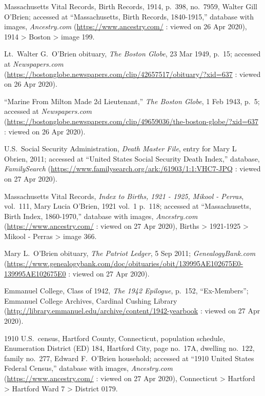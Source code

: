 \begin{thebibliography}{999}
	Massachusetts Vital Records, Birth Records, 1914, p.\ 398, no.\ 7959, Walter Gill O'Brien; accessed at ``Massachusetts, Birth Records, 1840-1915,'' database with images, \textit{Ancestry.com} (\url{https://www.ancestry.com/} : viewed on 26 Apr 2020), 1914 > Boston > image 199.
	
	Lt.\ Walter G.\ O'Brien obituary, \textit{The Boston Globe}, 23 Mar 1949, p.\ 15; accessed at \textit{Newspapers.com} (\url{https://bostonglobe.newspapers.com/clip/42657517/obituary/?xid=637} : viewed on 26 Apr 2020).
	
	``Marine From Milton Made 2d Lieutenant,'' \textit{The Boston Globe}, 1 Feb 1943, p.\ 5; accessed at \textit{Newspapers.com} (\url{https://bostonglobe.newspapers.com/clip/49659036/the-boston-globe/?xid=637} : viewed on 26 Apr 2020).
	
	U.S.\ Social Security Administration, \textit{Death Master File}, entry for Mary L Obrien, 2011; accessed at ``United States Social Security Death Index,'' database, \textit{FamilySearch} (\url{https://www.familysearch.org/ark:/61903/1:1:VHC7-JPQ} : viewed on 27 Apr 2020).
	
	Massachusetts Vital Records, \textit{Index to Births, 1921 - 1925, Mikool - Perras}, vol.\ 111, Mary Lucia O'Brien, 1921 vol.\ 1 p.\ 118; accessed at ``Massachusetts, Birth Index, 1860-1970,'' database with images, \textit{Ancestry.com} (\url{https://www.ancestry.com/} : viewed on 27 Apr 2020), Births > 1921-1925 > Mikool - Perras > image 366.
	
	Mary L.\ O'Brien obituary, \textit{The Patriot Ledger}, 5 Sep 2011; \textit{GenealogyBank.com} (\url{https://www.genealogybank.com/doc/obituaries/obit/139995AE102675E0-139995AE102675E0} : viewed on 27 Apr 2020).
	
	Emmanuel College, Class of 1942, \textit{The 1942 Epilogue}, p.\ 152, ``Ex-Members''; Emmanuel College Archives, Cardinal Cushing Library (\url{http://library.emmanuel.edu/archive/content/1942-yearbook} : viewed on 27 Apr 2020).
	
	1910 U.S.\ census, Hartford County, Connecticut, population schedule, Enumeration District (ED) 184, Hartford City, page no.\ 17A, dwelling no.\ 122, family no.\ 277, Edward F.\ O'Brien household; accessed at ``1910 United States Federal Census,'' database with images, \textit{Ancestry.com} (\url{https://www.ancestry.com/} : viewed on 27 Apr 2020), Connecticut > Hartford > Hartford Ward 7 > District 0179.
	

\end{thebibliography}
